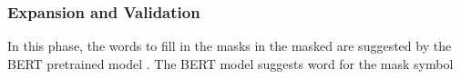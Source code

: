 
\subsubsection{\Sent Expansion and Validation}

In this phase, the words to fill in the masks in the masked \sents
are suggested by the BERT pretrained model \cite{}.  The BERT model
suggests word for the mask symbol


